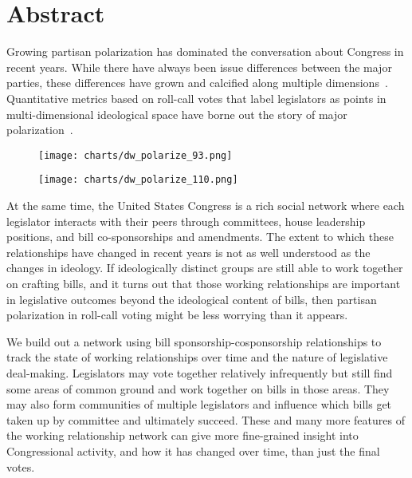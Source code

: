 \section{Abstract}

Growing partisan polarization has dominated the conversation about Congress in
recent years. While there have always been issue differences between the major
parties, these differences have grown and calcified along multiple
dimensions~\cite{Layman}. Quantitative metrics based on roll-call votes that
label legislators as points in multi-dimensional ideological space have borne
out the story of major polarization~\cite{Poole}.

\begin{figure}[htbp]
  \centering
  \begin{minipage}[h]{0.4\textwidth}
    \texttt{[image: charts/dw\_polarize\_93.png]}
  \end{minipage}
  \hfill
  \begin{minipage}[h]{0.4\textwidth}
    \texttt{[image: charts/dw\_polarize\_110.png]}
  \end{minipage}
\end{figure}

At the same time, the United States Congress is a rich social network where each
legislator interacts with their peers through committees, house leadership
positions, and bill co-sponsorships and amendments. The extent to which these
relationships have changed in recent years is not as well understood as the
changes in ideology. If ideologically distinct groups are still able to work
together on crafting bills, and it turns out that those working relationships
are important in legislative outcomes beyond the ideological content of bills,
then partisan polarization in roll-call voting might be less worrying than it
appears.

We build out a network using bill sponsorship-cosponsorship relationships to
track the state of working relationships over time and the nature of legislative
deal-making. Legislators may vote together relatively infrequently but still
find some areas of common ground and work together on bills in those areas. They
may also form communities of multiple legislators and influence which bills get
taken up by committee and ultimately succeed. These and many more features of
the working relationship network can give more fine-grained insight into
Congressional activity, and how it has changed over time, than just the final
votes.

